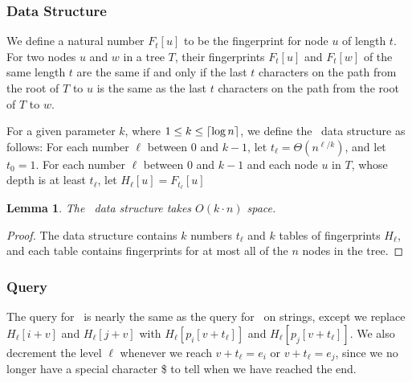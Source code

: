 \documentclass[a4]{article}
\newtheorem{lemma}{Lemma}
\begin{document}
\subsubsection{Data Structure}

We define a natural number $F_t[u]$ to be the fingerprint for node $u$ of length $t$. For two nodes $u$ and $w$ in a tree $T$, their fingerprints $F_t[u]$ and $F_t[w]$ of the same length $t$ are the same if and only if the last $t$ characters on the path from the root of $T$ to $u$ is the same as the last $t$ characters on the path from the root of $T$ to $w$.

For a given parameter $k$, where $1\leq k \leq \lceil\log n\rceil$, we define the \tfprintk\ data structure as follows: For each number $\ell$ between $0$ and $k-1$, let $t_\ell=\Theta(n^{\ell/k})$, and let $t_0 = 1$. For each number $\ell$ between $0$ and $k-1$ and each node $u$ in $T$, whose depth is at least $t_\ell$, let $H_\ell[u] = F_{t_\ell}[u]$

\begin{lemma}
The \tfprintk\ data structure takes $O(k\cdot n)$ space.
\end{lemma}
\begin{proof}
The data structure contains $k$ numbers $t_\ell$ and $k$ tables of fingerprints $H_\ell$, and each table contains fingerprints for at most all of the $n$ nodes in the tree.
\end{proof}

\subsubsection{Query}

The query for \tfprintk\ is nearly the same as the query for \fprintk\ on strings, except we replace $H_\ell[i+v]$ and $H_\ell[j+v]$ with $H_\ell[p_i[v+t_\ell]]$ and $H_\ell[p_j[v+t_\ell]]$. We also decrement the level $\ell$ whenever we reach $v+t_\ell=e_i$ or $v+t_\ell=e_j$, since we no longer have a special character \$ to tell when we have reached the end.

\end{document}
